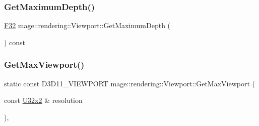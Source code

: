 \hypertarget{classmage_1_1rendering_1_1_viewport_a6be40c90f5435cf04f35d673565f91e7}{}\label{classmage_1_1rendering_1_1_viewport_a6be40c90f5435cf04f35d673565f91e7} 
\subsubsection{\texorpdfstring{Get\+Maximum\+Depth()}{GetMaximumDepth()}}
{\footnotesize\ttfamily \hyperlink{namespacemage_aa97e833b45f06d60a0a9c4fc22ae02c0}{F32} mage\+::rendering\+::\+Viewport\+::\+Get\+Maximum\+Depth (\begin{DoxyParamCaption}{ }\end{DoxyParamCaption}) const\hspace{0.3cm}{\ttfamily [noexcept]}}

\hypertarget{classmage_1_1rendering_1_1_viewport_ad565cc66f21bb3d3e00ae608ef926635}{}\label{classmage_1_1rendering_1_1_viewport_ad565cc66f21bb3d3e00ae608ef926635} 
\subsubsection{\texorpdfstring{Get\+Max\+Viewport()}{GetMaxViewport()}\hspace{0.1cm}{\footnotesize\ttfamily [1/2]}}
{\footnotesize\ttfamily static const D3\+D11\+\_\+\+V\+I\+E\+W\+P\+O\+RT mage\+::rendering\+::\+Viewport\+::\+Get\+Max\+Viewport (\begin{DoxyParamCaption}\item[{const \hyperlink{namespacemage_a88e05bff0300120c013285d3dcad95c5}{U32x2} \&}]{resolution }\end{DoxyParamCaption})\hspace{0.3cm}{\ttfamily [static]}, {\ttfamily [noexcept]}}

\hypertarget{classmage_1_1rendering_1_1_viewport_a64a61ea814f07b9904d158e24853e0dc}{}\label{classmage_1_1rendering_1_1_viewport_a64a61ea814f07b9904d158e24853e0dc} 
